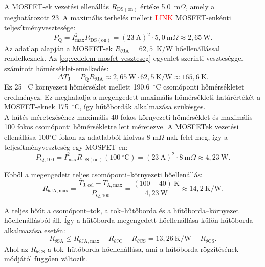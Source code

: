 A MOSFET-ek vezetési ellenállás $R_{\mathrm{DS(on)}}$ értéke 5.0~m$\Omega$, 
amely a meghatározott 23~A maximális terhelés mellett \textcolor{red}{LINK} MOSFET-enkénti teljesítményvesztesége:\\
\begin{equation}
    \label{eq:vedelem-mosfet-veszteseg}
    P_{\mathrm{Q}} = I_{\mathrm{max}}^2 R_{\mathrm{DS(on)}}
    = (23~\mathrm{A})^2\cdot5{,}0~\mathrm{m}\Omega
    \approx2{,}65~\mathrm{W}.
\end{equation}
Az adatlap alapján a MOSFET-ek $R_{\theta\mathrm{JA}}=62{,}5$~K/W hőellenállással rendelkeznek. Az \eqref{eq:vedelem-mosfet-veszteseg} 
egyenlet szerinti veszteséggel számított hőmérséklet-emelkedés:
\begin{equation}
    \label{eq:vedelem-mosfet-homersekletemelkedes}
    \Delta T_{\mathrm{J}} = P_{\mathrm{Q}} R_{\theta\mathrm{JA}}
    \approx2{,}65~\mathrm{W}\cdot62{,}5~\mathrm{K/W}
    \approx165{,}6~\mathrm{K}.
\end{equation}
Ez 25~$^\circ$C környezeti hőmérséklet mellett 190.6~$^\circ$C csomóponti hőmérsékletet eredményez. 
Ez meghaladja a megengedett maximális hőmérsékleti határértékét a MOSFET-eknek 175~$^\circ$C, 
így hűtőbordák alkalmazása szükésges. \\

A hűtés méretezéséhez maximális 40 fokos környezeti hőmérséklet és maximális 100 fokos csomóponti hőmérsékletre lett méretezve. 
A MOSFETek vezetési ellenállása 100$^\circ$C fokon az adatlabból kiolvas 8 m$\Omega$-nak felel meg, így a teljesítményveszteség
egy MOSFET-en:
\begin{equation}
    \label{eq:vedelem-mosfet-meleg-veszteseg}
    P_{\mathrm{Q,100}} = I_{\mathrm{max}}^2 R_{\mathrm{DS(on)}}(100~^\circ\mathrm{C})
    = (23~\mathrm{A})^2\cdot8~\mathrm{m}\Omega
    \approx4{,}23~\mathrm{W}.
\end{equation}

Ebből a megengedett teljes csomóponti--környezeti hőellenállás:
\begin{equation}
    \label{eq:vedelem-megengedett-hoellenallas}
    R_{\theta\mathrm{JA,max}}
    =\frac{T_{\mathrm{J,cel}}-T_{\mathrm{A,max}}}{P_{\mathrm{Q,100}}}
    =\frac{(100-40)~\mathrm{K}}{4{,}23~\mathrm{W}}
    \approx14{,}2~\mathrm{K/W}.
\end{equation}

A teljes hőút a csomópont--tok, a tok--hűtőborda és a hűtőborda--környezet hőellenállásból áll.
Így a hűtőborda megengedett hőellenállása külön hűtőborda alkalmazása esetén:
\begin{equation}
    \label{eq:vedelem-hutoborda}
    R_{\theta\mathrm{SA}}
    \leq R_{\theta\mathrm{JA,max}}
       -R_{\theta\mathrm{JC}}
       -R_{\theta\mathrm{CS}}
    = 13{,}26~\mathrm{K/W}
       -R_{\theta\mathrm{CS}}.
\end{equation}
Ahol az $R_{\theta\mathrm{CS}}$ a tok--hűtőborda hőellenállása, ami a hűtőborda rögzítésének módjától függően változik.

